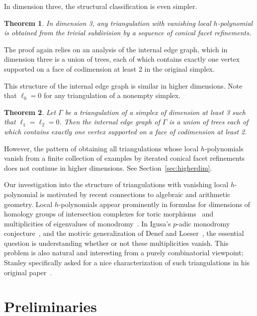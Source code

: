 \documentclass[10pt]{amsart}
\newtheorem{theorem}{Theorem}[section]
\begin{document}
In dimension three, the structural classification is even simpler.

\begin{theorem} \label{thm:dim3}
In dimension 3, any triangulation with vanishing local $h$-polynomial is obtained from the trivial subdivision by a sequence of conical facet refinements.
\end{theorem}

\noindent The proof again relies on an analysis of the internal edge graph, which in dimension three is a union of trees, each of which contains exactly one vertex supported on a face of codimension at least 2 in the original simplex.

This structure of the internal edge graph is similar in higher dimensions. Note that $\ell_0 = 0$ for any triangulation of a nonempty simplex.

\begin{theorem} \label{thm:internaledgegraph}
Let $\Gamma$ be a triangulation of a simplex of dimension at least 3 such that $\ell_1 = \ell_2 = 0$. Then the internal edge graph of $\Gamma$ is a union of trees each of which contains exactly one vertex supported on a face of codimension at least 2.
\end{theorem}

\noindent However, the pattern of obtaining all triangulations whose local $h$-polynomials vanish from a finite collection of examples by iterated conical facet refinements does not continue in higher dimensions. See Section~\ref{sec:higherdim}.

Our investigation into the structure of triangulations with vanishing local $h$-polynomial
is motivated by recent connections to algebraic and arithmetic geometry. 
Local $h$-polynomials appear prominently in formulas for dimensions of homology groups of
intersection complexes for toric morphisms~\cite{deCataldoMiglioriniMustata18} and 
multiplicities of eigenvalues of monodromy~\cite{KatzStapledon16, Stapledon17}. 
In Igusa's $p$-adic monodromy conjecture~\cite{Igusa75}, and the motivic generalization of
Denef and Loeser~\cite{DenefLoeser98}, the essential question is understanding whether or
not these multiplicities vanish. This problem is also natural and interesting from a
purely combinatorial viewpoint; Stanley specifically asked for a nice characterization of 
such triangulations in his original paper~\cite[Problem~4.13]{Stanley92}. 



\section{Preliminaries}
\end{document}
